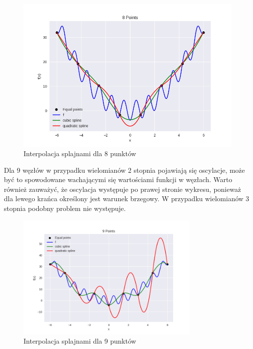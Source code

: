 \documentclass{article}
\begin{document}
\begin{figure}[H]
    \centering
    \includegraphics[width=\textwidth]{img/spline_8.png}
    \caption{Interpolacja splajnami dla 8 punktów}
\end{figure}

Dla 9 węzłów w przypadku wielomianów 2 stopnia pojawiają się oscylacje, może być to spowodowane
wachającymi się wartościami funkcji w węzłach. Warto również zauważyć, że oscylacja występuje po prawej stronie wykresu, 
ponieważ dla lewego krańca określony jest warunek brzegowy. W przypadku wielomianów 3 stopnia podobny problem nie występuje.

\begin{figure}[H]
    \centering
    \includegraphics[width=0.8\textwidth]{img/spline_9.png}
    \caption{Interpolacja splajnami dla 9 punktów}
\end{figure}
\end{document}
